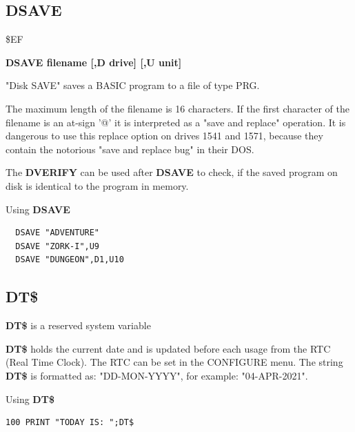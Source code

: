 \subsection{DSAVE}
\begin{description}[leftmargin=2cm,style=nextline]
\item [Token:] \$EF
\item [Format:] {\bf DSAVE filename [,D drive] [,U unit] }
\item [Usage:]
   "Disk SAVE" saves a BASIC program to
   a file of type PRG.

   \filenamedefinition
   The maximum length of the filename is 16 characters.
   If the first character of the filename is an at-sign '@' it
   is interpreted as a "save and replace" operation. It is dangerous
   to use this replace option on drives 1541 and 1571, because they
   contain the notorious "save and replace bug" in their DOS.

   \drivedefinition

   \unitdefinition

\item [Remarks:]
   The {\bf DVERIFY} can be used after {\bf DSAVE} to check,
   if the saved program on disk is identical to the program
   in memory.

\item [Example:] Using {\bf DSAVE}
\begin{tcolorbox}[colback=black,coltext=white]
\verbatimfont{\codefont}
\begin{verbatim}
  DSAVE "ADVENTURE"
  DSAVE "ZORK-I",U9
  DSAVE "DUNGEON",D1,U10
\end{verbatim}
\end{tcolorbox}
\end{description}


\newpage
\subsection{DT\$}
\begin{description}[leftmargin=2cm,style=nextline]
\item [Format:] {\bf DT\$} is a reserved system variable
\item [Usage:]  {\bf DT\$} holds the current date and is updated before
                each usage from the RTC (Real Time Clock).
                The RTC can be set in the CONFIGURE menu.
                The string {\bf DT\$} is formatted as:
                "DD-MON-YYYY", for example: "04-APR-2021".

\item [Example:] Using {\bf DT\$}
\begin{tcolorbox}[colback=black,coltext=white]
\verbatimfont{\codefont}
\begin{verbatim}
100 PRINT "TODAY IS: ";DT$
\end{verbatim}
\end{tcolorbox}
\end{description}

